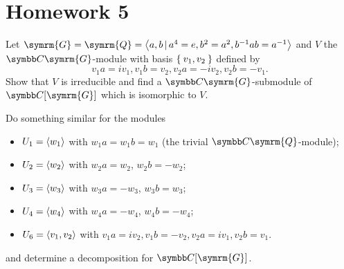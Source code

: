 \section*{Homework 5}

\begin{exercise}
Let \(\symrm{G} = \symrm{Q} = \generatedby{a, b \vbar a^4 = e, b^2 = a^2, b^{-1} a b = a^{-1}}\) and \(V\) the \(\complex \symrm{G}\)-module with basis \(\Set{v_1, v_2}\) defined by
\[
    v_1 a = i v_1, v_1 b = v_2, v_2 a = - i v_2, v_2 b = - v_1.
\]
Show that \(V\) is irreducible and find a \(\complex \symrm{G}\)-submodule of \(\complex[\symrm{G}]\) which is isomorphic to \(V\).

Do something similar for the modules
\begin{itemize}
    \item \(U_1 = \left\langle w_1\right\rangle\) with \(w_1 a = w_1 b = w_1\) (the trivial \(\complex \symrm{Q}\)-module);
    \item \(U_2 = \left\langle w_2\right\rangle\) with \(w_2 a = w_2\), \(w_2 b = -w_2\);
    \item \(U_3 = \left\langle w_3\right\rangle\) with \(w_3 a = -w_3\), \(w_3 b = w_3\);
    \item \(U_4 = \left\langle w_4\right\rangle\) with \(w_4 a = -w_4\), \(w_4 b = -w_4\);
    \item \(U_6 = \left\langle v_1, v_2\right\rangle\) with \(v_1 a = i v_2, v_1 b = -v_2, v_2 a = i v_1, v_2 b = v_1\).
\end{itemize}
and determine a decomposition for \(\complex[\symrm{G}]\).
\end{exercise}
